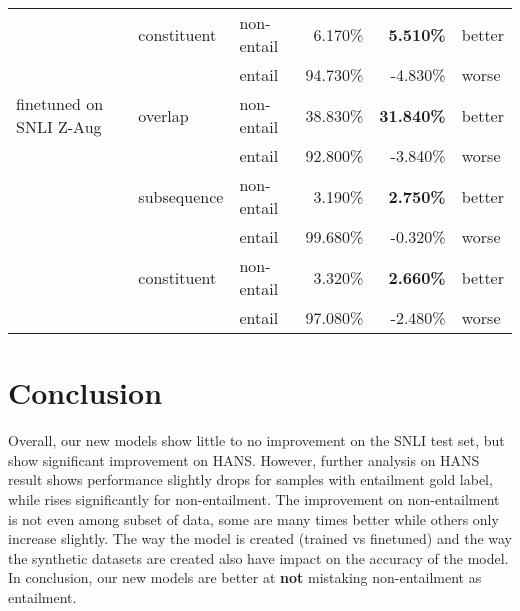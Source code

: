 \documentclass{article}
\begin{document}
\begin{table}[]
\begin{tabular}{lllrrl}
                                          & constituent         & non-entail          & 6.170\%                                & \textbf{5.510\%}                                & better        \\
                                          &                     & entail              & 94.730\%                               & -4.830\%                                        & worse         \\
        finetuned on SNLI Z-Aug          & overlap             & non-entail          & 38.830\%                               & \textbf{31.840\%}                               & better        \\
                                          &                     & entail              & 92.800\%                               & -3.840\%                                        & worse         \\
                                          & subsequence         & non-entail          & 3.190\%                                & \textbf{2.750\%}                                & better        \\
                                          &                     & entail              & 99.680\%                               & -0.320\%                                        & worse         \\
                                          & constituent         & non-entail          & 3.320\%                                & \textbf{2.660\%}                                & better        \\
                                          &                     & entail              & 97.080\%                               & -2.480\%                                        & worse        \\ \hline
    \end{tabular}
\end{table}


\section{Conclusion}

Overall, our new models show little to no improvement on the SNLI test set, but show significant improvement on HANS. However, further analysis on HANS result shows performance slightly drops for samples with entailment gold label, while rises significantly for non-entailment.
The improvement on non-entailment is not even among subset of data, some are many times better while others only increase slightly.
The way the model is created (trained vs finetuned) and the way the synthetic datasets are created also have impact on the accuracy of the model.
In conclusion, our new models are better at \textbf{not} mistaking non-entailment as entailment.
\end{document}
